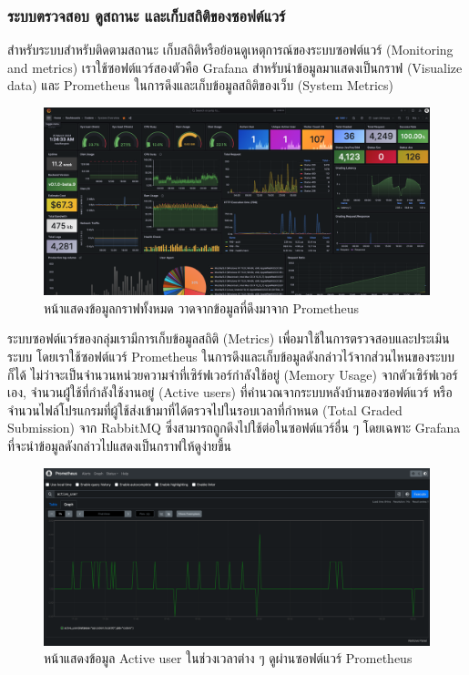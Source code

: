 \documentclass[12pt,one side,openright,a4paper]{cpe-thesis-th}
\newcommand{\thaijustify}[1]{%
  \par\hspace{30pt}\justifying
  #1
}
\begin{document}
\subsubsection{ระบบตรวจสอบ ดูสถานะ และเก็บสถิติของซอฟต์แวร์}
\thaijustify{
  สำหรับระบบสำหรับติดตามสถานะ เก็บสถิติหรือย้อนดูเหตุการณ์ของระบบซอฟต์แวร์ (Monitoring and metrics) เราใช้ซอฟต์แวร์สองตัวคือ Grafana สำหรับนำข้อมูลมาแสดงเป็นกราฟ (Visualize data) และ Prometheus ในการดึงและเก็บข้อมูลสถิติของเว็บ (System Metrics)
}
\begin{figure}[H]
  \centering
  \includegraphics[width=12cm]{figure/results/grafana.png}
  \caption[หน้าหลักของซอฟต์แวร์ Grafana]{หน้าแสดงข้อมูลกราฟทั้งหมด วาดจากข้อมูลที่ดึงมาจาก Prometheus}
  \label{fig:res-grafana}
\end{figure}
\thaijustify{
  ระบบซอฟต์แวร์ของกลุ่มเรามีการเก็บข้อมูลสถิติ (Metrics) เพื่อมาใช้ในการตรวจสอบและประเมินระบบ โดยเราใช้ซอฟต์แวร์ Prometheus ในการดึงและเก็บข้อมูลดังกล่าวไว้จากส่วนไหนของระบบก็ได้ ไม่ว่าจะเป็นจำนวนหน่วยความจำที่เซิร์ฟเวอร์กำลังใช้อยู่ (Memory Usage) จากตัวเซิร์ฟเวอร์เอง, จำนวนผู้่ใช้ที่กำลังใช้งานอยู่ (Active users) ที่คำนวณจากระบบหลังบ้านของซอฟต์แวร์ หรือจำนวนไฟล์โปรแกรมที่ผู้ใช้ส่งเข้ามาที่ได้ตรวจไปในรอบเวลาที่กำหนด (Total Graded Submission) จาก RabbitMQ ซึ่งสามารถถูกดึงไปใช้ต่อในซอฟต์แวร์อื่น ๆ โดยเฉพาะ Grafana ที่จะนำข้อมูลดังกล่าวไปแสดงเป็นกราฟให้ดูง่ายขึ้น
}
\begin{figure}[H]
  \centering
  \includegraphics[width=12cm]{figure/results/prometheus.png}
  \caption[หน้าแสดงข้อมูลของ Prometheus]{หน้าแสดงข้อมูล Active user ในช่วงเวลาต่าง ๆ ดูผ่านซอฟต์แวร์ Prometheus}
  \label{fig:res-prometheus}
\end{figure}
\end{document}

